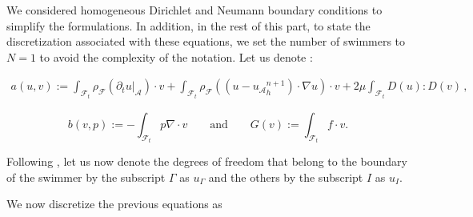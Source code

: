 \documentclass[graybox]{svmult}
\newcommand{\Fluid}{\mathcal{F}} %
\newcommand{\Alemap}{\mathcal{A}} %
\newcommand{\Vel}{u} %
\newcommand{\Pres}{p} %
\newcommand{\tvel}{U} %
\newcommand{\angvel}{\omega} %
\newcommand{\Solid}{\mathcal{S}} %
\newcommand{\normal}{n} %
\newcommand{\CompDomain}{\Fluid}
\begin{document}


We considered homogeneous Dirichlet and Neumann boundary conditions to simplify the formulations. In addition,
in the rest of this part, to state the discretization associated with these equations, we set the number of swimmers to $N=1$ to avoid the complexity of the notation.
Let us denote : 

\begin{eqnarray*}
a(u,v) := \int_{\CompDomain_{t}} \rho_\Fluid(\partial_t u|_\Alemap ) \cdot v + \int_{\CompDomain_{t}}\rho_\Fluid ((u -{u_{\mathcal{A}}}_h^{n+1} )\cdot \nabla u) \cdot v + 2\mu\int_{\CompDomain_{t}} D(u)	: D(v) \,, 
\end{eqnarray*}

$$
b(v,p) :=  -\int_{\CompDomain_{t}} p \nabla\cdot v \qquad \text{and} \qquad G(v) := \int_{{\CompDomain_{t}} } f \cdot v . 
$$
\color{black}

Following \cite{maury_direct_1999}, let us now denote the degrees of freedom that belong to the boundary of the swimmer by the subscript $\Gamma$ as $\Vel_\Gamma$ and the others by the subscript $I$ as $\Vel_I$.

\color{black}
We now discretize the previous equations as %
\end{document}
